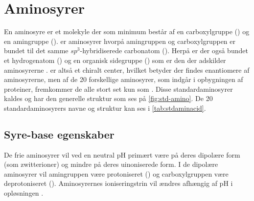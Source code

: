 \section{Aminosyrer}

En aminosyre er et molekyle der som minimum består af en carboxylgruppe () og en amingruppe ()\footnotemark{}.
 er aminosyrer hvorpå amingruppen og carboxylgruppen er bundet til det samme $sp^3$-hybridiserede carbonatom ().
Herpå er der også bundet et hydrogenatom () og en organisk sidegruppe () som er den der adskilder aminosyrerne \parencite{aminoBrit}.
 er altså et chiralt center,\footnotemark{} hvilket betyder der findes enantiomere af aminosyrerne, men af de 20 forskellige aminosyrer, som indgår i opbygningen af proteiner, fremkommer de alle stort set kun som  \parencite{basisA,chemana}.
Disse standardaminosyrer kaldes  og har den generelle struktur som ses på \cref{fig:std-amino}.
De 20 standardaminosyrers navne og struktur kan ses i \cref{tab:stdaminacid}.

\subsection{Syre-base egenskaber}
De frie aminosyrer vil ved en neutral pH primært være på deres dipolære form (som zwitterioner) og mindre på deres uinoniserede form.
I de dipolære aminosyrer vil amingruppen være protoniseret () og carboxylgruppen være deprotoniseret ().
Aminosyrernes ioniseringstrin vil ændres afhængig af pH i opløsningen \parencite{aminoBrit,chemana}.

